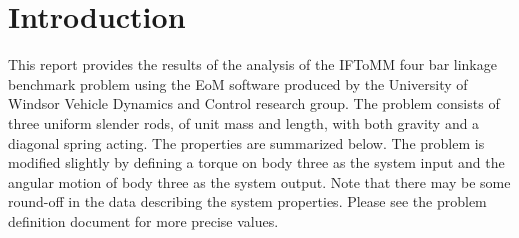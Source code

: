 \chapter{Introduction}
This report provides the results of the analysis of the IFToMM four bar linkage benchmark problem using the EoM software produced by the University of Windsor Vehicle Dynamics and Control research group.  The problem consists of three uniform slender rods, of unit mass and length, with both gravity and a diagonal spring acting.  The properties are summarized below.  The problem is modified slightly by defining a torque on body three as the system input and the angular motion of body three as the system output.  Note that there may be some round-off in the data describing the system properties.  Please see the problem definition document for more precise values.

